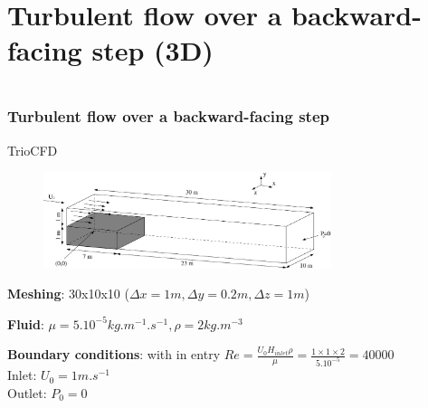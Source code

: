 \documentclass[10pt, hyperref={unicode=true,pdfusetitle, bookmarks=true,bookmarksnumbered=false,bookmarksopen=false, breaklinks=false,pdfborder={0 0 1},backref=true,colorlinks=true,linkcolor=darkblue,pageanchor}]{beamer}
\begin{document}
\section{{\bf{Turbulent flow over a backward-facing step (3D)}}}
\begin{frame}
\begin{small}
\begin{columns}[c] 
\tableofcontents[sections={1-9},currentsection, currentsubsection]
\tableofcontents[sections={10-16},currentsection, currentsubsection]
\end{columns}
\end{small}
\end{frame}
\begin{frame}
\frametitle{Turbulent flow over a backward-facing step}
\begin{block}{TrioCFD}

\begin{figure}
\includegraphics[width=0.75\textwidth]{PICTURES/marche3D.pdf}
\end{figure}

\textbf{Meshing}: 30x10x10 ($\Delta x=1m, \Delta y=0.2m, \Delta z=1m$)

\textbf{Fluid}: $\mu=5.10^{-5} kg.m^{-1}.s^{-1}, \rho=2 kg.m^{-3}$

\textbf{Boundary conditions}: with in entry $Re=\frac{U_0 H_{inlet} \rho}{\mu} = \frac{1 \times 1 \times 2}{5.10^{-5}} = 40000$\\
Inlet: $U_0=1 m.s^{-1}$\\
Outlet: $P_0=0$

\end{block}
\end{frame}
\end{document}
